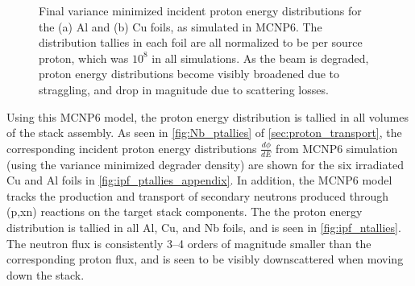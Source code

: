 \begin{figure}
    \centering    
    \caption{Final variance minimized incident proton energy distributions for the (a) Al and (b) Cu foils, as simulated in MCNP6. The distribution tallies in each foil are all normalized to be per source proton, which was $10^8$ in all simulations. As the beam is degraded, proton energy distributions become visibly broadened due to straggling, and drop in magnitude due to scattering losses.}
     \label{fig:ipf_ptallies_appendix}
\end{figure}



Using this MCNP6 model, the proton energy distribution is tallied in all volumes of the stack assembly.
As seen in \autoref{fig:Nb_ptallies} of \autoref{sec:proton_transport}, the corresponding incident proton  energy distributions $\frac{d\phi}{dE}$ from MCNP6 simulation (using the variance minimized degrader density) are shown for the six irradiated Cu and Al  foils in \autoref{fig:ipf_ptallies_appendix}. 
In addition, the MCNP6 model tracks the production and transport of secondary neutrons produced through (p,xn) reactions on the target stack components.
The the proton energy distribution is tallied in all Al, Cu, and Nb foils, and is seen in \autoref{fig:ipf_ntallies}. 
The neutron flux is consistently 3--4 orders of magnitude smaller than the corresponding proton flux, and is seen to be visibly  downscattered when moving down the stack.

